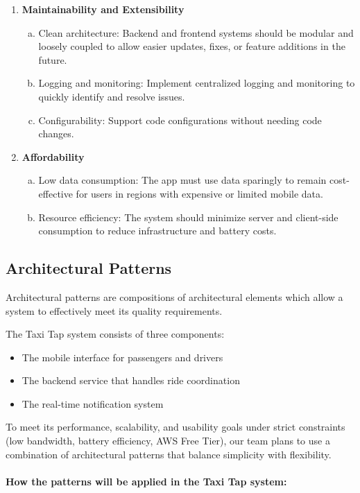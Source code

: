 \documentclass[a4paper,12pt]{article}
\begin{document}
\begin{enumerate}
    \item \textbf{Maintainability and Extensibility}
    \begin{enumerate}[a.]
        \item Clean architecture: Backend and frontend systems should be modular and loosely coupled to allow easier updates, fixes, or feature additions in the future.
        \item Logging and monitoring: Implement centralized logging and monitoring to quickly identify and resolve issues.
        \item Configurability: Support code configurations without needing code changes.
    \end{enumerate}

    \item \textbf{Affordability}
    \begin{enumerate}[a.]
        \item Low data consumption: The app must use data sparingly to remain cost-effective for users in regions with expensive or limited mobile data.
        \item Resource efficiency: The system should minimize server and client-side consumption to reduce infrastructure and battery costs.
    \end{enumerate}
\end{enumerate}

\subsection{Architectural Patterns}
Architectural patterns are compositions of architectural elements which allow a system to effectively meet its quality requirements.

The Taxi Tap system consists of three components:
\begin{itemize}
    \item The mobile interface for passengers and drivers
    \item The backend service that handles ride coordination
    \item The real-time notification system
\end{itemize}

To meet its performance, scalability, and usability goals under strict constraints (low bandwidth, battery efficiency, AWS Free Tier), our team plans to use a combination of architectural patterns that balance simplicity with flexibility.

\paragraph{How the patterns will be applied in the Taxi Tap system:}
\end{document}
